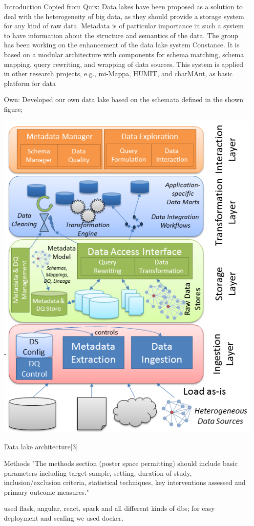 \documentclass[12pt]{beamer}
\begin{document}
\begin{textblock}{0.5}
\begin{block}{Introduction}
Copied from Quix: Data lakes have been proposed as a solution to deal with the heterogeneity of big data, as they should provide a storage system for any kind of raw data. Metadata is of particular importance in such a system to have information about the structure and semantics of the data. The group has been working on the enhancement of the data lake system Constance. It is based on a modular architecture with components for schema matching, schema mapping, query rewriting, and wrapping of data sources. This system is applied in other research projects, e.g., mi-Mappa, HUMIT, and charMAnt, as basic platform for data
\par
\bigskip
\bigskip
Own: Developed our own data lake based on the schemata defined in the shown figure; 
\vspace{1.0\baselineskip}
\begin{wfigure}{1.0}{1}
\includegraphics[width=0.75\columnwidth]{graphics/dlarch}
\caption{Data lake architecture[3]}
\end{wfigure}
\hfill
\end{block}

\begin{block}{Methods}
"The methods section (poster space permitting) should include basic parameters including target sample, setting, duration of study, inclusion/exclusion criteria, statistical techniques, key interventions assessed and primary outcome measures."

used flask, angular, react, spark and all different kinds of dbs; for easy deployment and scaling we used docker.
\end{block}


\end{textblock}
\end{document}
